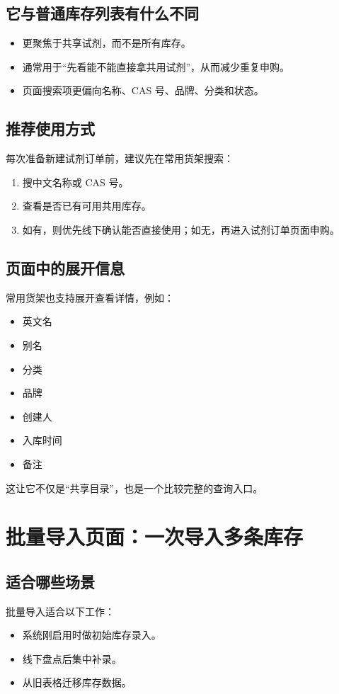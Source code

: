\documentclass[12pt,a4paper]{ctexart}
\begin{document}
\subsection{它与普通库存列表有什么不同}
\begin{itemize}
  \item 更聚焦于共享试剂，而不是所有库存。
  \item 通常用于“先看能不能直接拿共用试剂”，从而减少重复申购。
  \item 页面搜索项更偏向名称、CAS 号、品牌、分类和状态。
\end{itemize}

\subsection{推荐使用方式}
每次准备新建试剂订单前，建议先在常用货架搜索：
\begin{enumerate}
  \item 搜中文名称或 CAS 号。
  \item 查看是否已有可用共用库存。
  \item 如有，则优先线下确认能否直接使用；如无，再进入试剂订单页面申购。
\end{enumerate}

\subsection{页面中的展开信息}
常用货架也支持展开查看详情，例如：
\begin{itemize}
  \item 英文名
  \item 别名
  \item 分类
  \item 品牌
  \item 创建人
  \item 入库时间
  \item 备注
\end{itemize}

这让它不仅是“共享目录”，也是一个比较完整的查询入口。

\newpage
\section{批量导入页面：一次导入多条库存}

\subsection{适合哪些场景}
批量导入适合以下工作：
\begin{itemize}
  \item 系统刚启用时做初始库存录入。
  \item 线下盘点后集中补录。
  \item 从旧表格迁移库存数据。
\end{itemize}
\end{document}

